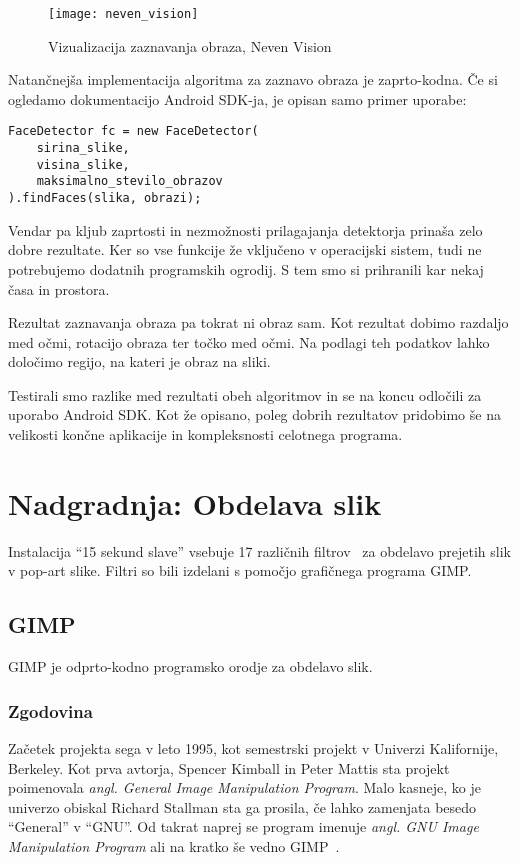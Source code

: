\begin{figure}[!ht]
    \centering
    \texttt{[image: neven\_vision]}
    \caption{Vizualizacija zaznavanja obraza, Neven Vision}
    \label{fig:neven_vision}
\end{figure}

Natančnejša implementacija algoritma za zaznavo obraza je zaprto-kodna. Če si ogledamo dokumentacijo Android SDK-ja, je opisan samo primer uporabe:
\pagebreak %
\begin{lstlisting}[caption="Primer uporabe zaznavanja obraza z orodjem Android SDK"]
FaceDetector fc = new FaceDetector(
    sirina_slike,
    visina_slike,
    maksimalno_stevilo_obrazov
).findFaces(slika, obrazi);
\end{lstlisting}

Vendar pa kljub zaprtosti in nezmožnosti prilagajanja detektorja prinaša zelo dobre rezultate. Ker so vse funkcije že vključeno v operacijski sistem, tudi ne potrebujemo dodatnih programskih ogrodij. S tem smo si prihranili kar nekaj časa in prostora.

Rezultat zaznavanja obraza pa tokrat ni obraz sam. Kot rezultat dobimo razdaljo med očmi, rotacijo obraza ter točko med očmi. Na podlagi teh
podatkov lahko določimo regijo, na kateri je obraz na sliki.

Testirali smo razlike med rezultati obeh algoritmov in se na koncu odločili za uporabo Android SDK. Kot že opisano, poleg dobrih rezultatov pridobimo še na velikosti končne aplikacije in kompleksnosti celotnega programa.


\chapter{Nadgradnja: Obdelava slik}
\label{ch:obdelavaSlik}
Instalacija ``15 sekund slave'' vsebuje 17 različnih
filtrov~\cite[Poglavje~5]{thesisSamoJuvan} za obdelavo prejetih slik v
pop-art slike. Filtri so bili izdelani s pomočjo grafičnega programa GIMP.


\section{GIMP}
GIMP je odprto-kodno programsko orodje za obdelavo slik.


\subsection{Zgodovina}
Začetek projekta sega v leto 1995, kot semestrski projekt v Univerzi
Kalifornije, Berkeley. Kot prva avtorja, Spencer Kimball in Peter Mattis sta
projekt poimenovala \textit{angl. General Image Manipulation Program}. Malo
kasneje, ko je univerzo obiskal Richard Stallman sta ga prosila, če lahko
zamenjata besedo ``General'' v ``GNU''. Od takrat naprej se program imenuje
\textit{angl. GNU Image Manipulation Program} ali na kratko še vedno
GIMP~\cite{wiki:GIMP}.



